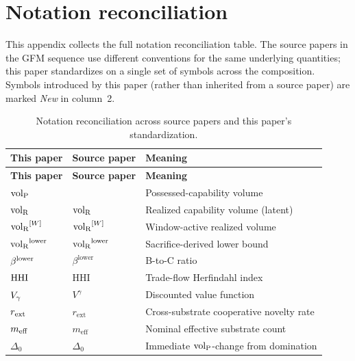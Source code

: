 \section{Notation reconciliation}
\label{app:notation}

This appendix collects the full notation reconciliation table.  The
source papers in the GFM sequence use different conventions for the
same underlying quantities; this paper standardizes on a single set
of symbols across the composition.  Symbols introduced by this
paper (rather than inherited from a source paper) are marked
\emph{New} in column~2.

{\footnotesize
\renewcommand{\arraystretch}{1.15}
\begin{longtable}{@{}p{} p{} p{}@{}}
\caption{Notation reconciliation across source papers and this paper's standardization.}
\label{tab:notation}\\
\toprule
\textbf{This paper} & \textbf{Source paper} & \textbf{Meaning} \\
\midrule
\endfirsthead
\toprule
\textbf{This paper} & \textbf{Source paper} & \textbf{Meaning} \\
\midrule
\endhead
\bottomrule
\endlastfoot
${\operatorname{vol}_{\mathrm{P}}}$ & \citep{lasser2026poset} & Possessed-capability volume \\
${\operatorname{vol}_{\mathrm{R}}}$ & \citep[Revealed Sacrifice]{lasser2026paper8a} ${\operatorname{vol}_{\mathrm{R}}}$ & Realized capability volume (latent) \\
${\operatorname{vol}_{\mathrm{R}}}^{[W]}$ & \citep[Revealed Sacrifice]{lasser2026paper8a} ${\operatorname{vol}_{\mathrm{R}}}^{[W]}$ & Window-active realized volume \\
${\operatorname{vol}_{\mathrm{R}}}^{\mathrm{lower}}$ & \citep[Revealed Sacrifice]{lasser2026paper8a} ${\operatorname{vol}_{\mathrm{R}}}^{\mathrm{lower}}$ & Sacrifice-derived lower bound \\
$\beta^{\mathrm{lower}}$ & \citep[Revealed Sacrifice]{lasser2026paper8a} $\beta^{\mathrm{lower}}$ & B-to-C ratio \\
$\mathrm{HHI}$ & \citep[Need Sufficiency]{lasser2026paper8b} $\mathrm{HHI}$ & Trade-flow Herfindahl index \\
\midrule
$V_{\gamma}$ & \citep[Horizon Aware]{lasser2026horizon} $V^\gamma$ & Discounted value function \\
$r_{\mathrm{ext}}$ & \citep[Horizon Aware]{lasser2026horizon} $r_{\mathrm{ext}}$ & Cross-substrate cooperative novelty rate \\
$m_{\mathrm{eff}}$ & \citep[Horizon Aware]{lasser2026horizon} $m_{\mathrm{eff}}$ & Nominal effective substrate count \\
$\Delta_0$ & \citep[Horizon Aware]{lasser2026horizon} $\Delta_0$ & Immediate ${\operatorname{vol}_{\mathrm{P}}}$-change from domination \\

\end{longtable}}
